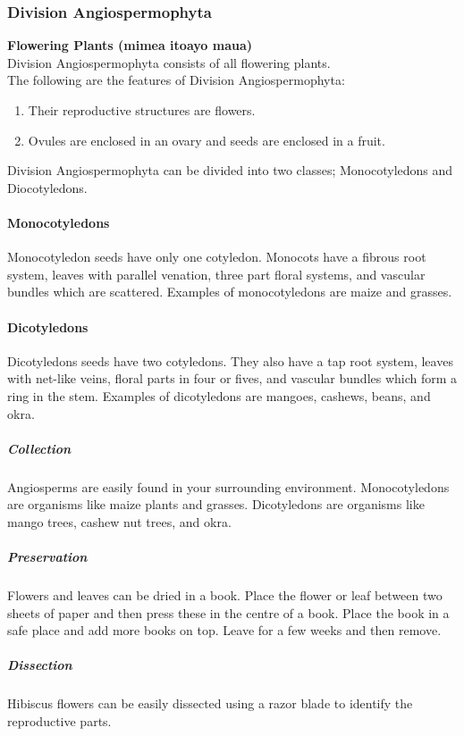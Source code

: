 \begin{multicols}{2}
\subsubsection{Division Angiospermophyta}
\textbf{Flowering Plants (mimea itoayo maua)}\\ 
Division Angiospermophyta consists of all flowering plants. \\
The following are the features of Division Angiospermophyta:
\begin{enumerate}
\item{Their reproductive structures are flowers.} 
\item{Ovules are enclosed in an ovary and seeds are enclosed in a fruit.}
\end{enumerate}

Division Angiospermophyta can be divided into two classes; Monocotyledons and Diocotyledons.

\setcounter{secnumdepth}{4}

\paragraph{\textbf{Monocotyledons}}
Monocotyledon seeds have only one cotyledon. Monocots have a fibrous root system, leaves with parallel venation, three part floral systems, and vascular bundles which are scattered. Examples of monocotyledons are maize and grasses.

\paragraph{\textbf{Dicotyledons}}
Dicotyledons seeds have two cotyledons. They also have a tap root system, leaves with net-like veins, floral parts in four or fives, and vascular bundles which form a ring in the stem. Examples of dicotyledons are mangoes, cashews, beans, and okra.

\subparagraph{Collection}
Angiosperms are easily found in your surrounding environment. Monocotyledons are organisms like maize plants and grasses. Dicotyledons are organisms like mango trees, cashew nut trees, and okra.

\subparagraph{Preservation} 
Flowers and leaves can be dried in a book. Place the flower or leaf between two sheets of paper and then press these in the centre of a book. Place the book in a safe place and add more books on top. Leave for a few weeks and then remove.

\subparagraph{Dissection}
Hibiscus flowers can be easily dissected using a razor blade to identify the reproductive parts.

\end{multicols}

